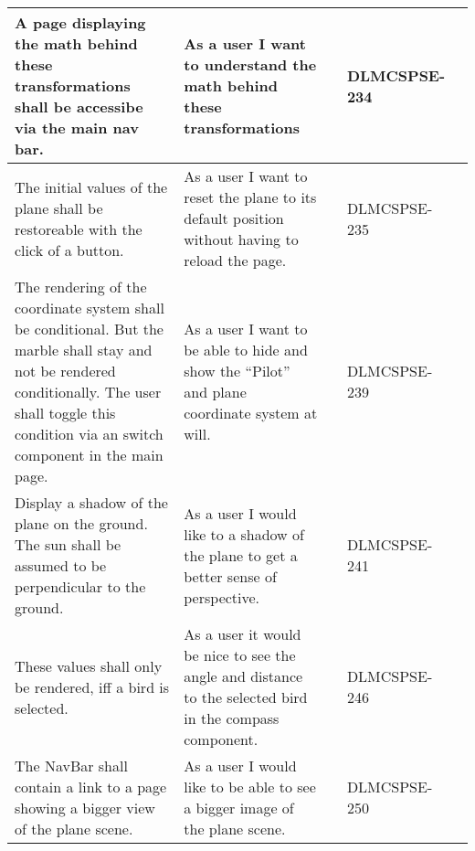 \begin{xltabular}{\textwidth}{|X|X|M{1.8cm}|M{1.4cm}|M{1.3cm}|}
  A page displaying the math behind these transformations shall be accessibe via the main nav bar. & As a user I want to understand the math behind these transformations &  & {\color{purpleT}\ttfamily DLMCSPSE-234} &  \\ \hline 
  The initial values of the plane shall be restoreable with the click of a button. & As a user I want to reset the plane to its default position without having to reload the page. &  & {\color{purpleT}\ttfamily DLMCSPSE-235} &  \\ \hline 
  The rendering of the coordinate system shall be conditional. \newline But the marble shall stay and not be rendered conditionally. \newline The user shall toggle this condition via an switch component in the main page. & As a user I want to be able to hide and show the “Pilot” and plane coordinate system at will. &  & {\color{purpleT}\ttfamily DLMCSPSE-239} &  \\ \hline 
  Display a shadow of the plane on the ground. \newline The sun shall be assumed to be perpendicular to the ground. & As a user I would like to a shadow of the plane to get a better sense of perspective. &  & {\color{purpleT}\ttfamily DLMCSPSE-241} &  \\ \hline 
  These values shall only be rendered, iff a bird is selected. & As a user it would be nice to see the angle and distance to the selected bird in the compass component. &  & {\color{purpleT}\ttfamily DLMCSPSE-246} &  \\ \hline 
  The NavBar shall contain a link to a page showing a bigger view of the plane scene. & As a user I would like to be able to see a bigger image of the plane scene. &  & {\color{purpleT}\ttfamily DLMCSPSE-250} &  \\ \hline 

\end{xltabular}
